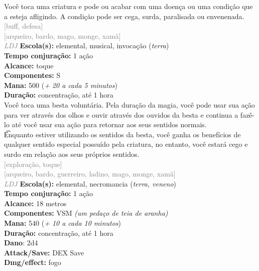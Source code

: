 \documentclass{RPG_Adventure}[2021/10/20]
\begin{document}
{\normalsize Você toca uma criatura e pode ou acabar com uma doença ou uma condição que a esteja afligindo. A condição pode ser cega, surda, paralisada ou envenenada.\\}
{\scriptsize \textcolor{gray}{[buff, defesa]\\}}
{\scriptsize \textcolor{gray}{[arqueiro, bardo, mago, monge, xamã]\\}}
{\tiny \textcolor{gray}{\textit{LDJ}}}\jump{}
{\small \t \textbf{Escola(s):} elemental, musical, invocação (\textit{terra})\\\t \textbf{Tempo conjuração:} 1 ação\\\t \textbf{Alcance:} toque\\\t \textbf{Componentes:} S\\\t \textbf{Mana:} 500 (\textit{+ 20 a cada 5 minutos})\\\t \textbf{Duração:} concentração, até 1 hora\\}
{\normalsize Você toca uma besta voluntária. Pela duração da magia, você pode usar sua ação para ver através dos olhos e ouvir através dos ouvidos da besta e continua a fazê-lo até você usar sua ação para retornar aos seus sentidos normais.\\\t Enquanto estiver utilizando os sentidos da besta, você ganha os benefícios de qualquer sentido especial possuído pela criatura, no entanto, você estará cego e surdo em relação aos seus próprios sentidos.\\}
{\scriptsize \textcolor{gray}{[exploração, toque]\\}}
{\scriptsize \textcolor{gray}{[arqueiro, bardo, guerreiro, ladino, mago, monge, xamã]\\}}
{\tiny \textcolor{gray}{\textit{LDJ}}}\jump{}
{\small \t \textbf{Escola(s):} elemental, necromancia (\textit{terra, veneno})\\\t \textbf{Tempo conjuração:} 1 ação\\\t \textbf{Alcance:} 18 metros\\\t \textbf{Componentes:} VSM \textit{(um pedaço de teia de aranha)}\\\t \textbf{Mana:} 540 (\textit{+ 10 a cada 10 minutos})\\\t \textbf{Duração:} concentração, até 1 hora\\\t \textbf{Dano}: 2d4\\\t \textbf{Attack/Save:} DEX Save\\\t \textbf{Dmg/effect:} fogo\\}
\end{document}
